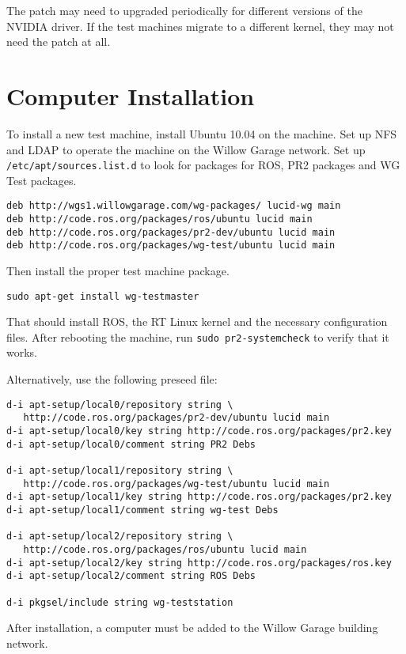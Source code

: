 \documentclass[11pt]{book}
\begin{document}
The patch may need to upgraded periodically for different versions of the NVIDIA driver. If the test machines migrate to a different kernel, they may not need the patch at all.


\section{Computer Installation}

To install a new test machine, install Ubuntu 10.04 on the machine. Set up NFS and LDAP to operate the machine on the Willow Garage network. Set up \texttt{/etc/apt/sources.list.d} to look for packages for ROS, PR2 packages and WG Test packages.

\begin{verbatim}
deb http://wgs1.willowgarage.com/wg-packages/ lucid-wg main
deb http://code.ros.org/packages/ros/ubuntu lucid main
deb http://code.ros.org/packages/pr2-dev/ubuntu lucid main
deb http://code.ros.org/packages/wg-test/ubuntu lucid main
\end{verbatim}

Then install the proper test machine package.
\begin{verbatim}
sudo apt-get install wg-testmaster
\end{verbatim}
That should install ROS, the RT Linux kernel and the necessary configuration files. After rebooting the machine, run \texttt{sudo pr2-systemcheck} to verify that it works.

Alternatively, use the following preseed file:
\begin{verbatim}
d-i apt-setup/local0/repository string \
   http://code.ros.org/packages/pr2-dev/ubuntu lucid main
d-i apt-setup/local0/key string http://code.ros.org/packages/pr2.key
d-i apt-setup/local0/comment string PR2 Debs

d-i apt-setup/local1/repository string \
   http://code.ros.org/packages/wg-test/ubuntu lucid main
d-i apt-setup/local1/key string http://code.ros.org/packages/pr2.key
d-i apt-setup/local1/comment string wg-test Debs

d-i apt-setup/local2/repository string \
   http://code.ros.org/packages/ros/ubuntu lucid main
d-i apt-setup/local2/key string http://code.ros.org/packages/ros.key
d-i apt-setup/local2/comment string ROS Debs

d-i pkgsel/include string wg-teststation
\end{verbatim}

After installation, a computer must be added to the Willow Garage building network.
\end{document}
